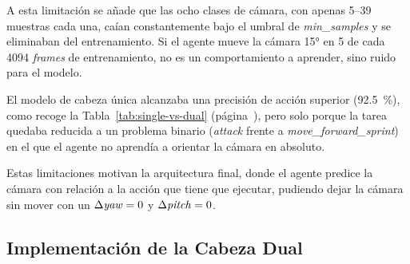 A esta limitación se añade que las ocho clases de cámara, con apenas \numrange{5}{39}
muestras cada una, caían constantemente bajo el umbral de \textit{min\_samples}
y se eliminaban del entrenamiento.
Si el agente mueve la cámara \ang{15} en \num{5} de cada \num{4094} \textit{frames} de entrenamiento,
no es un comportamiento a aprender, sino ruido para el modelo.

El modelo de cabeza única alcanzaba una precisión de acción superior
(\qty{92.5}{\percent}), como recoge la Tabla~\ref{tab:single-vs-dual} (página~\pageref{tab:single-vs-dual}), pero solo
porque la tarea quedaba reducida a un problema binario (\textit{attack} frente a \textit{move\_forward\_sprint}) 
en el que el agente no aprendía a orientar la cámara en absoluto.

Estas limitaciones motivan la arquitectura final, donde el agente predice la cámara con relación
a la acción que tiene que ejecutar, pudiendo dejar la cámara sin mover con un $\Delta\text{\textit{yaw}}=\num{0}$ y $\Delta\text{\textit{pitch}}=\num{0}$.

\begin{table}[htbp]
  \centering
  \caption[Cabeza única frente a cabeza dual]{Comparación de la cabeza única
  (cámara discreta) frente a la doble cabeza. La mayor precisión de la cabeza única
  es engañosa: solo conserva dos clases de acción porque descarta toda la
  cámara; la doble cabeza conserva las acciones disponibles del experto y, además, modela el movimiento
  de cámara continuo.}
  \label{tab:single-vs-dual}
\end{table}

\subsection{Implementación de la Cabeza Dual}
\label{sec:il-arch-dual}

